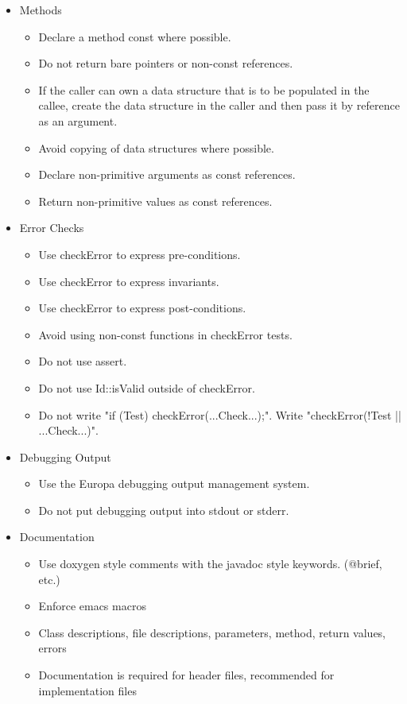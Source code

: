 \documentclass[10pt, letterpaper, twoside]{article}
\begin{document}
\begin{itemize}
\item[] Methods
 \begin{itemize}
  \item	Declare a method const where possible.
  \item	Do not return bare pointers or non-const references.
  \item	If the caller can own a data structure that is to be populated in the callee, create the data structure in the caller and then pass it by reference as an argument.
  \item	Avoid copying of data structures where possible.
  \item	Declare non-primitive arguments as const references.
  \item	Return non-primitive values as const references.
 \end{itemize}

\item[] Error Checks
 \begin{itemize}
  \item	Use checkError to express pre-conditions.
  \item	Use checkError to express invariants.
  \item	Use checkError to express post-conditions.
  \item	Avoid using non-const functions in checkError tests.
  \item	Do not use assert.
  \item	Do not use Id::isValid outside of checkError.
  \item	Do not write "if (Test) checkError(...Check...);".  Write "checkError(!Test || ...Check...)".
 \end{itemize}

\item[] Debugging Output
 \begin{itemize}
  \item	Use the Europa debugging output management system.
  \item	Do not put debugging output into stdout or stderr.
 \end{itemize}

\item[] Documentation
 \begin{itemize}
  \item	Use doxygen style comments with the javadoc style keywords. (@brief, etc.)
  \item	Enforce emacs macros
  \item	Class descriptions, file descriptions, parameters, method, return values, errors  
  \item	Documentation is required for header files, recommended for implementation files
 \end{itemize}
\end{itemize}
\end{document}
